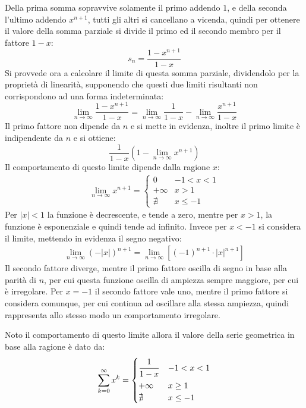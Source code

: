 \documentclass{article}
\numberwithin{equation}{subsection}
\begin{document}
Della prima somma sopravvive solamente il primo addendo $1$, e della seconda l'ultimo addendo $x^{n+1}$, tutti gli altri si cancellano a vicenda, quindi per ottenere il valore della somma parziale si divide il primo ed il secondo membro per il fattore $1-x$:
\begin{equation}
    s_n=\displaystyle\frac{1-x^{n+1}}{1-x}
\end{equation}
Si provvede ora a calcolare il limite di questa somma parziale, dividendolo per la proprietà di linearità, supponendo che questi due limiti risultanti non corrispondono ad una forma indeterminata:
\begin{equation*}
    \lim_{n\to\infty}\displaystyle\frac{1-x^{n+1}}{1-x}=\lim_{n\to\infty}\frac{1}{1-x}-\lim_{n\to\infty}\frac{x^{n+1}}{1-x}
\end{equation*}
Il primo fattore non dipende da $n$ e si mette in evidenza, inoltre il primo limite è indipendente da $n$ e si ottiene:
\begin{equation*}
    \displaystyle\frac{1}{1-x}\left(1-\lim_{n\to\infty}x^{n+1}\right)
\end{equation*}
Il comportamento di questo limite dipende dalla ragione $x$:
\begin{gather}
    \lim_{n\to\infty}x^{n+1}=\begin{cases}
        0 &-1<x<1\\
        +\infty  & x>1\\
        \nexists & x\leq-1
    \end{cases}
\end{gather}
Per $|x|<1$ la funzione è decrescente, e tende a zero, mentre per $x>1$, la funzione è esponenziale e quindi tende ad infinito. Invece per $x<-1$ si considera il limite, mettendo in evidenza il segno negativo:
\begin{gather*}
    \lim_{n\to\infty}(-|x|)^{n+1}=
    \lim_{n\to\infty}\left[(-1)^{n+1}\cdot |x|^{n+1}\right]
\end{gather*}
Il secondo fattore diverge, mentre il primo fattore oscilla di segno in base alla parità di $n$, per cui questa funzione oscilla di ampiezza sempre maggiore, per cui è irregolare. 
Per $x=-1$ il secondo fattore vale uno, mentre il primo fattore si considera comunque, per cui continua ad oscillare alla stessa ampiezza, quindi rappresenta allo stesso modo un comportamento irregolare. 

Noto il comportamento di questo limite allora il valore della serie geometrica in base alla ragione è dato da:
\begin{equation}
    \displaystyle\sum_{k=0}^\infty x^k=\begin{cases}
        \displaystyle\frac{\strut 1}{\strut 1-x} &-1<x<1\\
        +\infty & x\geq1\\
        \nexists & x\leq-1
    \end{cases}
\end{equation}
\end{document}
